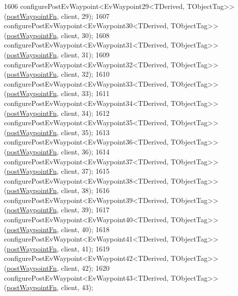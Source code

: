 \begin{DoxyCode}
1606     configurePostEvWaypoint<EvWaypoint29<TDerived, TObjectTag>>(\hyperlink{classsmacc_1_1WaypointEventDispatcher_a6bccf6a93a827634b7b5e67ac0e4ec57}{postWaypointFn}, client, 29);
1607     configurePostEvWaypoint<EvWaypoint30<TDerived, TObjectTag>>(\hyperlink{classsmacc_1_1WaypointEventDispatcher_a6bccf6a93a827634b7b5e67ac0e4ec57}{postWaypointFn}, client, 30);
1608     configurePostEvWaypoint<EvWaypoint31<TDerived, TObjectTag>>(\hyperlink{classsmacc_1_1WaypointEventDispatcher_a6bccf6a93a827634b7b5e67ac0e4ec57}{postWaypointFn}, client, 31);
1609     configurePostEvWaypoint<EvWaypoint32<TDerived, TObjectTag>>(\hyperlink{classsmacc_1_1WaypointEventDispatcher_a6bccf6a93a827634b7b5e67ac0e4ec57}{postWaypointFn}, client, 32);
1610     configurePostEvWaypoint<EvWaypoint33<TDerived, TObjectTag>>(\hyperlink{classsmacc_1_1WaypointEventDispatcher_a6bccf6a93a827634b7b5e67ac0e4ec57}{postWaypointFn}, client, 33);
1611     configurePostEvWaypoint<EvWaypoint34<TDerived, TObjectTag>>(\hyperlink{classsmacc_1_1WaypointEventDispatcher_a6bccf6a93a827634b7b5e67ac0e4ec57}{postWaypointFn}, client, 34);
1612     configurePostEvWaypoint<EvWaypoint35<TDerived, TObjectTag>>(\hyperlink{classsmacc_1_1WaypointEventDispatcher_a6bccf6a93a827634b7b5e67ac0e4ec57}{postWaypointFn}, client, 35);
1613     configurePostEvWaypoint<EvWaypoint36<TDerived, TObjectTag>>(\hyperlink{classsmacc_1_1WaypointEventDispatcher_a6bccf6a93a827634b7b5e67ac0e4ec57}{postWaypointFn}, client, 36);
1614     configurePostEvWaypoint<EvWaypoint37<TDerived, TObjectTag>>(\hyperlink{classsmacc_1_1WaypointEventDispatcher_a6bccf6a93a827634b7b5e67ac0e4ec57}{postWaypointFn}, client, 37);
1615     configurePostEvWaypoint<EvWaypoint38<TDerived, TObjectTag>>(\hyperlink{classsmacc_1_1WaypointEventDispatcher_a6bccf6a93a827634b7b5e67ac0e4ec57}{postWaypointFn}, client, 38);
1616     configurePostEvWaypoint<EvWaypoint39<TDerived, TObjectTag>>(\hyperlink{classsmacc_1_1WaypointEventDispatcher_a6bccf6a93a827634b7b5e67ac0e4ec57}{postWaypointFn}, client, 39);
1617     configurePostEvWaypoint<EvWaypoint40<TDerived, TObjectTag>>(\hyperlink{classsmacc_1_1WaypointEventDispatcher_a6bccf6a93a827634b7b5e67ac0e4ec57}{postWaypointFn}, client, 40);
1618     configurePostEvWaypoint<EvWaypoint41<TDerived, TObjectTag>>(\hyperlink{classsmacc_1_1WaypointEventDispatcher_a6bccf6a93a827634b7b5e67ac0e4ec57}{postWaypointFn}, client, 41);
1619     configurePostEvWaypoint<EvWaypoint42<TDerived, TObjectTag>>(\hyperlink{classsmacc_1_1WaypointEventDispatcher_a6bccf6a93a827634b7b5e67ac0e4ec57}{postWaypointFn}, client, 42);
1620     configurePostEvWaypoint<EvWaypoint43<TDerived, TObjectTag>>(\hyperlink{classsmacc_1_1WaypointEventDispatcher_a6bccf6a93a827634b7b5e67ac0e4ec57}{postWaypointFn}, client, 43);

\end{DoxyCode}
